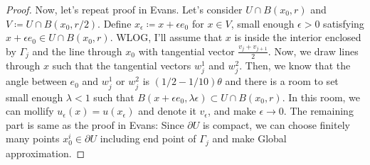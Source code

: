 \documentclass{article}
\begin{document}
\begin{proof}
Now, let's repeat proof in Evans. Let's consider $U\cap B(x_0, r)$ and $V\coloneqq U\cap B(x_0, r/2)$. Define $x_\epsilon\coloneqq x+\epsilon e_0$ for $x\in V$, small enough $\epsilon>0$ satisfying $x+\epsilon e_0\in U\cap B(x_0, r)$. WLOG, I'll assume that $x$ is inside the interior enclosed by $\Gamma_j$ and the line through $x_0$ with tangential vector $\frac{v_j+v_{j+1}}{2}$. Now, we draw lines through $x$ such that the tangential vectors $w^1_j$ and $w^2_j$. Then, we know that the angle between $e_0$ and $w^1_j$ or $w^2_j$ is $(1/2-1/10)\theta$ and there is a room to set small enough $\lambda<1$ such that $B(x+\epsilon e_0, \lambda \epsilon)\subset U\cap B(x_0, r)$. In this room, we can mollify $u_\epsilon(x)=u(x_\epsilon)$ and denote it $v_\epsilon$, and make $\epsilon\rightarrow 0$. The remaining part is same as the proof in Evans: Since $\partial U$ is compact, we can choose finitely many points $x_0^i\in \partial U$ including end point of $\Gamma_j$ and make Global approximation.
\end{proof}
\end{document}

